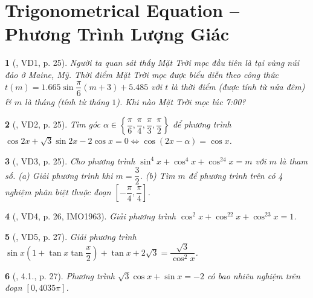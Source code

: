 \documentclass{article}
\newtheorem{baitoan}{}
\begin{document}

\section{Trigonometrical Equation -- Phương Trình Lượng Giác}

\begin{baitoan}[\cite{Hung_nang_cao_phat_trien_Toan_11_tap_1}, VD1, p. 25]
	Người ta quan sát thấy Mặt Trời mọc đầu tiên là tại vùng núi đảo ở Maine, Mỹ. Thời điểm Mặt Trời mọc được biểu diễn theo công thức $t(m) = 1.665\sin\dfrac{\pi}{6}(m + 3) + 5.485$ với $t$ là thời điểm (được tính từ nửa đêm) \& $m$ là tháng (tính từ tháng $1$). Khi nào Mặt Trời mọc lúc {\rm7:00}?
\end{baitoan}

\begin{baitoan}[\cite{Hung_nang_cao_phat_trien_Toan_11_tap_1}, VD2, p. 25]
	Tìm góc $\alpha\in\left\{\dfrac{\pi}{6},\dfrac{\pi}{4},\dfrac{\pi}{3},\dfrac{\pi}{2}\right\}$ để phương trình $\cos2x + \sqrt{3}\sin2x - 2\cos x = 0\Leftrightarrow\cos(2x - \alpha) = \cos x$.
\end{baitoan}

\begin{baitoan}[\cite{Hung_nang_cao_phat_trien_Toan_11_tap_1}, VD3, p. 25]
	Cho phương trình $\sin^4x + \cos^4x + \cos^24x = m$ với $m$ là tham số. (a) Giải phương trình khi $m = \dfrac{3}{2}$. (b) Tìm $m$ để phương trình trên có 4 nghiệm phân biệt thuộc đoạn $\left[-\dfrac{\pi}{4},\dfrac{\pi}{4}\right]$.
\end{baitoan}

\begin{baitoan}[\cite{Hung_nang_cao_phat_trien_Toan_11_tap_1}, VD4, p. 26, IMO1963]
	Giải phương trình $\cos^2x + \cos^22x + \cos^23x = 1$.
\end{baitoan}

\begin{baitoan}[\cite{Hung_nang_cao_phat_trien_Toan_11_tap_1}, VD5, p. 27]
	Giải phương trình $\sin x\left(1 + \tan x\tan\dfrac{x}{2}\right) + \tan x + 2\sqrt{3} = \dfrac{\sqrt{3}}{\cos^2x}$.
\end{baitoan}

\begin{baitoan}[\cite{Hung_nang_cao_phat_trien_Toan_11_tap_1}, 4.1., p. 27]
	Phương trình $\sqrt{3}\cos x + \sin x = -2$ có bao nhiêu nghiệm trên đoạn $[0,4035\pi]$.
\end{baitoan}
\end{document}
